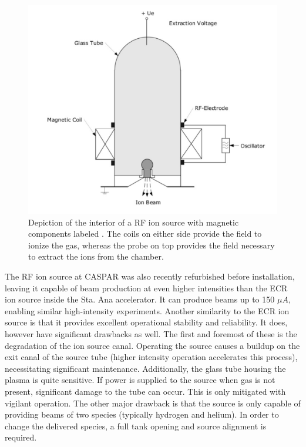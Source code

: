 \begin{figure}
\includegraphics[width=\linewidth]{figures/rfSchematic.png}
\caption{Depiction of the interior of a RF ion source with magnetic components labeled \cite{Li2015}. The coils on either side provide the field to ionize the gas, whereas the probe on top provides the field necessary to extract the ions from the chamber.}
\label{fig: rfis}
\end{figure}

The RF ion source at CASPAR was also recently refurbished before installation, leaving it capable of beam production at even higher intensities than the ECR ion source inside the Sta. Ana accelerator. It can produce beams up to 150 $\mu A$, enabling similar high-intensity experiments. Another similarity to the ECR ion source is that it provides excellent operational stability and reliability. It does, however have significant drawbacks as well. The first and foremost of these is the degradation of the ion source canal. Operating the source causes a buildup on the exit canal of the source tube (higher intensity operation accelerates this process), necessitating significant maintenance. Additionally, the glass tube housing the plasma is quite sensitive. If power is supplied to the source when gas is not present, significant damage to the tube can occur. This is only mitigated with vigilant operation. The other major drawback is that the source is only capable of providing beams of two species (typically hydrogen and helium). In order to change the delivered species, a full tank opening and source alignment is required. 

